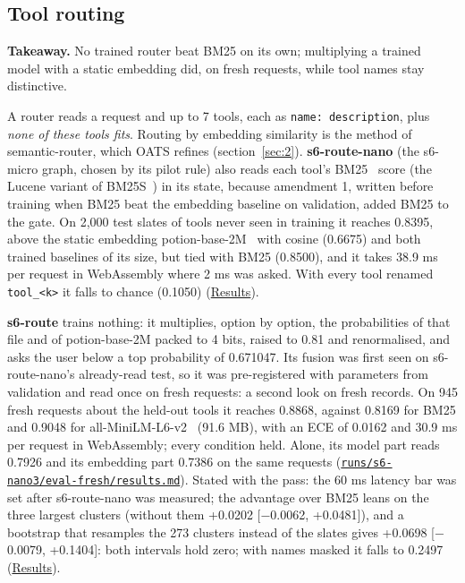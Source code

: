 \documentclass[10pt]{article}
\begin{document}
\subsection{Tool routing}\label{sec:6.3}

\textbf{Takeaway.} No trained router beat BM25 on its own; multiplying a trained model with a static embedding did, on fresh requests, while tool names stay distinctive.

A router reads a request and up to 7 tools, each as \texttt{name: description}, plus \emph{none of these tools fits}. Routing by embedding similarity is the method of semantic-router, which OATS refines (section~\ref{sec:2}). \textbf{s6-route-nano} (the s6-micro graph, chosen by its pilot rule) also reads each tool's BM25~\cite{robertson2009bm25} score (the Lucene variant of BM25S~\cite{lu2024bm25s}) in its state, because amendment 1, written before training when BM25 beat the embedding baseline on validation, added BM25 to the gate. On 2,000 test slates of tools never seen in training it reaches 0.8395, above the static embedding potion-base-2M~\cite{potion} with cosine (0.6675) and both trained baselines of its size, but tied with BM25 (0.8500), and it takes 38.9 ms per request in WebAssembly where 2 ms was asked. With every tool renamed \texttt{tool\_\allowbreak{}<k>} it falls to chance (0.1050) (\href{https://maxgfr.github.io/skycmd/results/\#s6-route-nano-failed}{Results}).

\textbf{s6-route} trains nothing: it multiplies, option by option, the probabilities of that file and of potion-base-2M packed to 4 bits, raised to 0.81 and renormalised, and asks the user below a top probability of 0.671047. Its fusion was first seen on s6-route-nano's already-read test, so it was pre-registered with parameters from validation and read once on fresh requests: a second look on fresh records. On 945 fresh requests about the held-out tools it reaches 0.8868, against 0.8169 for BM25 and 0.9048 for all-MiniLM-L6-v2~\cite{minilm} (91.6 MB), with an ECE of 0.0162 and 30.9 ms per request in WebAssembly; every condition held. Alone, its model part reads 0.7926 and its embedding part 0.7386 on the same requests (\href{https://github.com/maxgfr/skycmd/blob/main/runs/s6-nano3/eval-fresh/results.md}{\texttt{runs/\allowbreak{}s6-nano3/\allowbreak{}eval-fresh/\allowbreak{}results.md}}). Stated with the pass: the 60 ms latency bar was set after s6-route-nano was measured; the advantage over BM25 leans on the three largest clusters (without them +0.0202 [$-$0.0062, +0.0481]), and a bootstrap that resamples the 273 clusters instead of the slates gives +0.0698 [$-$0.0079, +0.1404]: both intervals hold zero; with names masked it falls to 0.2497 (\href{https://maxgfr.github.io/skycmd/results/\#s6-route-passed}{Results}).
\end{document}
